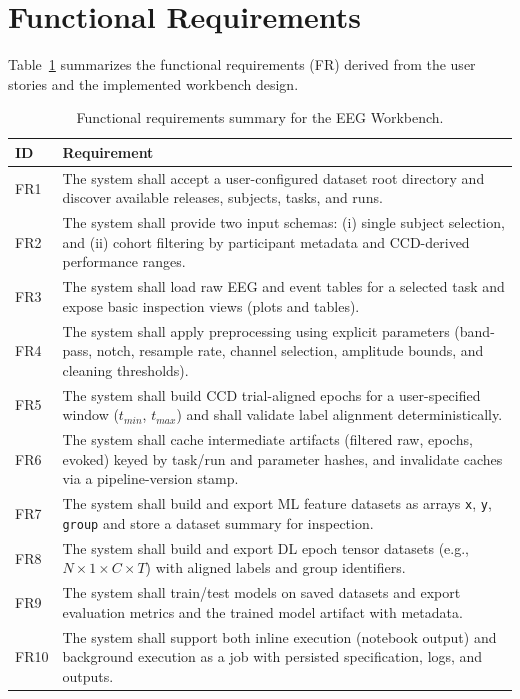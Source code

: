 \section{Functional Requirements}
\label{sec:functional-requirements}

Table~\ref{tab:fr-summary} summarizes the functional requirements (FR) derived from the user stories and the implemented workbench design.

\begin{table}[H]
\centering
\begin{tabularx}{\textwidth}{|l|X|}
\hline
\textbf{ID} & \textbf{Requirement} \\
\hline
FR1 & The system shall accept a user-configured dataset root directory and discover available releases, subjects, tasks, and runs. \\
\hline
FR2 & The system shall provide two input schemas: (i) single subject selection, and (ii) cohort filtering by participant metadata and CCD-derived performance ranges. \\
\hline
FR3 & The system shall load raw EEG and event tables for a selected task and expose basic inspection views (plots and tables). \\
\hline
FR4 & The system shall apply preprocessing using explicit parameters (band-pass, notch, resample rate, channel selection, amplitude bounds, and cleaning thresholds). \\
\hline
FR5 & The system shall build CCD trial-aligned epochs for a user-specified window ($t_{min}$, $t_{max}$) and shall validate label alignment deterministically. \\
\hline
FR6 & The system shall cache intermediate artifacts (filtered raw, epochs, evoked) keyed by task/run and parameter hashes, and invalidate caches via a pipeline-version stamp. \\
\hline
FR7 & The system shall build and export ML feature datasets as arrays \texttt{x}, \texttt{y}, \texttt{group} and store a dataset summary for inspection. \\
\hline
FR8 & The system shall build and export DL epoch tensor datasets (e.g., $N\times 1\times C\times T$) with aligned labels and group identifiers. \\
\hline
FR9 & The system shall train/test models on saved datasets and export evaluation metrics and the trained model artifact with metadata. \\
\hline
FR10 & The system shall support both inline execution (notebook output) and background execution as a job with persisted specification, logs, and outputs. \\
\hline
\end{tabularx}
\caption{Functional requirements summary for the EEG Workbench.}
\label{tab:fr-summary}
\end{table}

